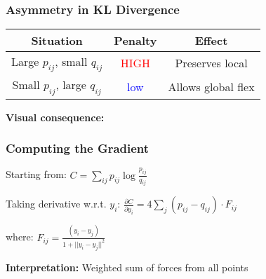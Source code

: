 \documentclass[aspectratio=169]{beamer}
\begin{document}
\begin{frame}
\frametitle{Asymmetry in KL Divergence}

\begin{center}
\begin{tabular}{c|c|c}
\textbf{Situation} & \textbf{Penalty} & \textbf{Effect}\\
\hline
Large $p_{ij}$, small $q_{ij}$ & \textcolor{red}{HIGH} & Preserves local\\
Small $p_{ij}$, large $q_{ij}$ & \textcolor{blue}{low} & Allows global flex\\
\end{tabular}
\end{center}

\vspace{0.5cm}
\textbf{Visual consequence:}


\end{frame}

\begin{frame}
\frametitle{Computing the Gradient}

Starting from:
  $C = \sum_{ij} p_{ij} \log \frac{p_{ij}}{q_{ij}}$
  
  Taking derivative w.r.t. $y_i$:
  $\frac{\partial C}{\partial y_i} = 4\sum_j (p_{ij} - q_{ij})\cdot F_{ij}$
  
  where:
  $F_{ij} = \frac{(y_i - y_j)}{1 + ||y_i - y_j||^2}$
  
  \textbf{Interpretation:} Weighted sum of forces from all points

\end{frame}
\end{document}
